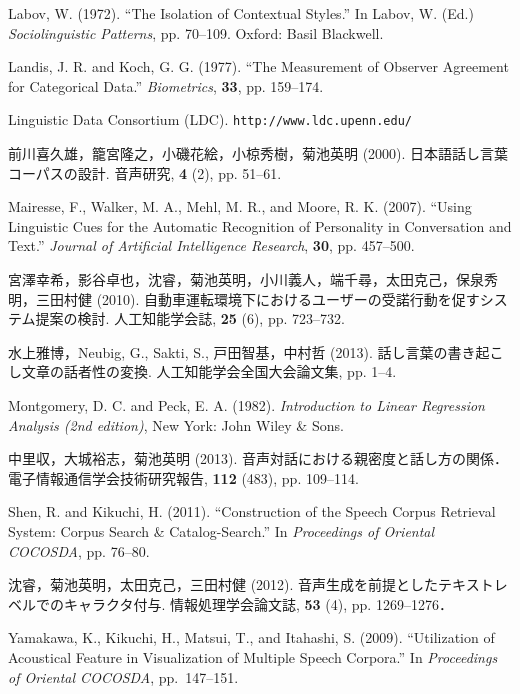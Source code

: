 \documentclass[japanese]{jnlp_1.4}
\begin{document}
\begin{thebibliography}{}
\item
Labov, W. (1972). ``The Isolation of Contextual Styles.'' In Labov, W. (Ed.) \textit{Sociolinguistic Patterns}, pp. 70--109. Oxford: Basil Blackwell. 

\item
Landis, J. R. and Koch, G. G. (1977). ``The Measurement of Observer Agreement for Categorical Data.'' \textit{Biometrics}, \textbf{33}, pp. 159--174.

\item
Linguistic Data Consortium (LDC). \texttt{http://www.ldc.upenn.edu/}

\item
前川喜久雄，籠宮隆之，小磯花絵，小椋秀樹，菊池英明 (2000). 日本語話し言葉コーパスの設計. 音声研究, \textbf{4} (2), pp. 51--61.

\item
Mairesse, F., Walker, M. A., Mehl, M. R., and Moore, R. K. (2007). ``Using Linguistic Cues for the Automatic Recognition of Personality in Conversation and Text.'' \textit{Journal of Artificial Intelligence Research}, \textbf{30}, pp. 457--500.

\item
宮澤幸希，影谷卓也，沈睿，菊池英明，小川義人，端千尋，太田克己，保泉秀明，三田村健 (2010). 自動車運転環境下におけるユーザーの受諾行動を促すシステム提案の検討. 人工知能学会誌, \textbf{25} (6), pp. 723--732.

\item
水上雅博，Neubig, G., Sakti, S., 戸田智基，中村哲 (2013). 話し言葉の書き起こし文章の話者性の変換. 人工知能学会全国大会論文集, pp. 1--4.

\item
Montgomery, D. C. and Peck, E. A. (1982). \textit{Introduction to Linear Regression Analysis (2nd edition)}, New York: John Wiley {\&} Sons.

\item
中里収，大城裕志，菊池英明 (2013). 音声対話における親密度と話し方の関係． 電子情報通信学会技術研究報告, \textbf{112} (483), pp. 109--114.

\item
Shen, R. and Kikuchi, H. (2011). ``Construction of the Speech Corpus Retrieval System: Corpus Search {\&} Catalog-Search.'' In \textit{Proceedings of Oriental COCOSDA}, pp. 76--80.

\item
沈睿，菊池英明，太田克己，三田村健 (2012). 音声生成を前提としたテキストレベルでのキャラクタ付与. 情報処理学会論文誌, \textbf{53} (4), pp. 1269--1276．

\item
Yamakawa, K., Kikuchi, H., Matsui, T., and Itahashi, S. (2009). ``Utilization of Acoustical Feature in Visualization of Multiple Speech Corpora.'' In \textit{Proceedings of Oriental COCOSDA}, pp.~147--151.

\end{thebibliography}
\end{document}
